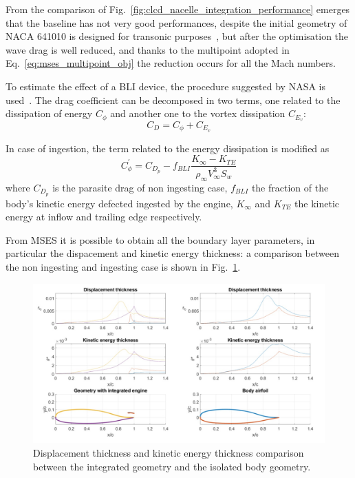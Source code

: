 From the comparison of Fig.~\ref{fig:clcd_nacelle_integration_performance} emerges that the baseline has not very good performances, despite the initial geometry of NACA 641010 is designed for transonic purposes~\cite{bib:anderson_aero}, but after the optimisation the wave drag is well reduced, and thanks to the multipoint adopted in Eq.~\eqref{eq:mses_multipoint_obj} the reduction occurs for all the Mach numbers.

To estimate the effect of a BLI device, the procedure suggested by NASA is used~\cite{bib:bwb_n3_vol2}. 
The drag coefficient can be decomposed in two terms, one related to the dissipation of energy $C_{\phi}$ and another one to the vortex dissipation $C_{E_{v}}$:
\begin{equation}
	\label{eq:cd_energy_decomposition}
	C_D = C_{\phi} + C_{E_{v}}
\end{equation}

In case of ingestion, the term related to the energy dissipation is modified as
\begin{equation}
	C_{\phi}^{'} = C_{D_{p}} - f_{BLI} \frac{K_{\infty}-K_{TE}}{\rho_{\infty}V_{\infty}^3S_w}
\end{equation}
where $C_{D_{p}}$ is the parasite drag of non ingesting case, $f_{BLI}$ the fraction of the body's kinetic energy defected ingested by the engine, $K_{\infty}$ and $K_{TE}$ the kinetic energy at inflow and trailing edge respectively. 

From MSES it is possible to obtain all the boundary layer parameters, in particular the dispacement and kinetic energy thickness: a comparison between the non ingesting and ingesting case is shown in Fig.~\ref{fig:bwb_nacelle_bl_param_comp}.
\begin{figure}[!h]
	\centering
	\includegraphics[keepaspectratio, width=\textwidth]{images/chap4/bwb_nacelle_bl_param.jpg}
	\caption{Displacement thickness and kinetic energy thickness comparison between the integrated geometry and the isolated body geometry.}
	\label{fig:bwb_nacelle_bl_param_comp}
\end{figure}

